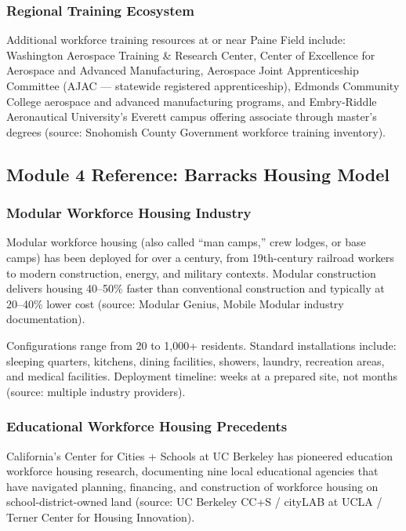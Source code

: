 \documentclass[11pt,letterpaper]{article}
\begin{document}
\subsubsection{Regional Training Ecosystem}

Additional workforce training resources at or near Paine Field include: Washington Aerospace Training \& Research Center, Center of Excellence for Aerospace and Advanced Manufacturing, Aerospace Joint Apprenticeship Committee (AJAC --- statewide registered apprenticeship), Edmonds Community College aerospace and advanced manufacturing programs, and Embry-Riddle Aeronautical University's Everett campus offering associate through master's degrees (source: Snohomish County Government workforce training inventory).

\subsection{Module 4 Reference: Barracks Housing Model}

\subsubsection{Modular Workforce Housing Industry}

Modular workforce housing (also called ``man camps,'' crew lodges, or base camps) has been deployed for over a century, from 19th-century railroad workers to modern construction, energy, and military contexts. Modular construction delivers housing 40--50\% faster than conventional construction and typically at 20--40\% lower cost (source: Modular Genius, Mobile Modular industry documentation).

Configurations range from 20 to 1,000+ residents. Standard installations include: sleeping quarters, kitchens, dining facilities, showers, laundry, recreation areas, and medical facilities. Deployment timeline: weeks at a prepared site, not months (source: multiple industry providers).

\subsubsection{Educational Workforce Housing Precedents}

California's Center for Cities + Schools at UC Berkeley has pioneered education workforce housing research, documenting nine local educational agencies that have navigated planning, financing, and construction of workforce housing on school-district-owned land (source: UC Berkeley CC+S / cityLAB at UCLA / Terner Center for Housing Innovation).
\end{document}

